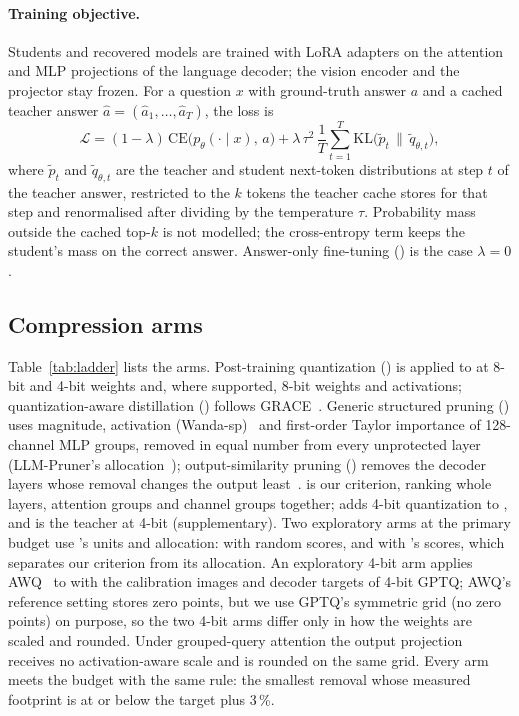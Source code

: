 \paragraph{Training objective.}
Students and recovered models are trained with LoRA adapters on the attention and MLP
projections of the language decoder; the vision encoder and the projector stay
frozen. For a question $x$ with ground-truth answer $a$ and a cached teacher answer
$\hat a=(\hat a_1,\dots,\hat a_T)$, the loss is
\begin{equation}
  \mathcal{L} = (1-\lambda)\,\mathrm{CE}\bigl(p_\theta(\cdot\mid x),\,a\bigr)
  + \lambda\,\tau^{2}\,\frac{1}{T}\sum_{t=1}^{T}
  \mathrm{KL}\bigl(\tilde p_t \,\|\, \tilde q_{\theta,t}\bigr),
  \label{eq:loss}
\end{equation}
where $\tilde p_t$ and $\tilde q_{\theta,t}$ are the teacher and student next-token
distributions at step $t$ of the teacher answer, restricted to the $k$ tokens the
teacher cache stores for that step and renormalised after dividing by the temperature
$\tau$. Probability mass outside the cached top-$k$ is not modelled; the
cross-entropy term keeps the student's mass on the correct answer. Answer-only
fine-tuning () is the case $\lambda=0$. 


\subsection{Compression arms}
Table~\ref{tab:ladder} lists the arms. Post-training quantization () is
applied to  at 8-bit and 4-bit weights and, where supported, 8-bit weights
and activations; quantization-aware distillation () follows
GRACE~\cite{chen_grace}. Generic structured pruning () uses
magnitude, activation (Wanda-sp)~\cite{sun_wanda} and first-order Taylor importance of
128-channel MLP groups, removed in equal number from every unprotected layer
(LLM-Pruner's allocation~\cite{ma2023llmpruner}); output-similarity pruning ()
removes the decoder layers whose removal changes the output
least~\cite{khan_compression_medical_mllm}.  is our criterion, ranking whole
layers, attention groups and channel groups together;  adds 4-bit quantization
to , and  is the teacher at 4-bit (supplementary). Two exploratory
arms at the primary budget use 's units and allocation:  with
random scores, and  with 's scores, which separates our criterion
from its allocation. An exploratory 4-bit arm applies AWQ~\cite{lin_awq} to 
with the calibration images and decoder targets of 4-bit GPTQ; AWQ's reference setting
stores zero points, but we use GPTQ's symmetric grid (no zero points) on purpose, so the
two 4-bit arms differ only in how the weights are scaled and rounded. Under grouped-query
attention the output projection receives no activation-aware scale and is rounded on the
same grid. Every arm meets the budget with the same rule: the smallest removal
whose measured footprint is at or below the target plus 3\,\%. 

